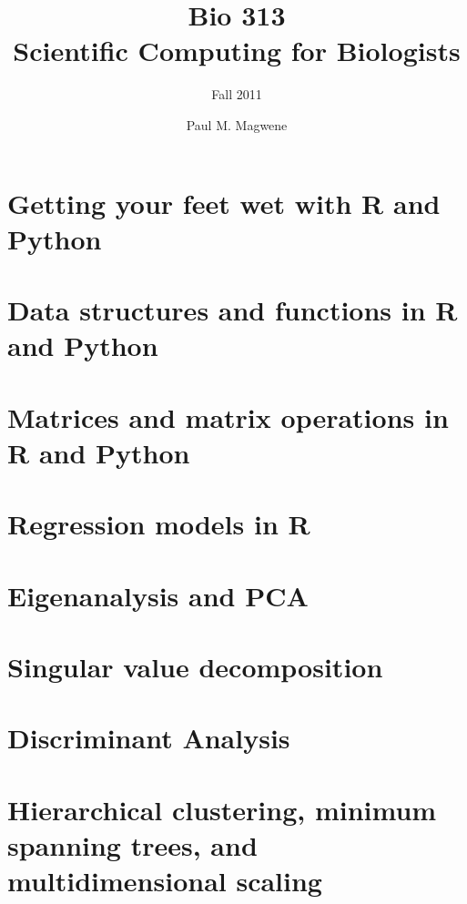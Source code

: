 \documentclass[9pt,twocolumn,oneside,bigheadings,tablecaptionabove]{scrbook}
\title{Bio 313\\Scientific Computing for Biologists}
\subtitle{Fall 2011}
\author{Paul M. Magwene}
\begin{document}
\maketitle
\clearpage


\clearscrheadfoot
\pagestyle{scrheadings}

\tableofcontents
\clearpage


\clearscrheadfoot
{}
\ihead{\tikzhead\headmark}
\ohead{\pagemark}
\pagestyle{scrheadings}
\renewcommand*{\chapterpagestyle}{scrheadings}
 

\chapter{Getting your feet wet with R and Python}



\chapter{Data structures and functions in R and Python}


\chapter{Matrices and matrix operations in R and Python}


\chapter{Regression models in R}


\chapter{Eigenanalysis and PCA}


\chapter{Singular value decomposition}


\chapter{Discriminant Analysis}


\chapter{Hierarchical clustering, minimum spanning trees, and multidimensional scaling}

\end{document}
